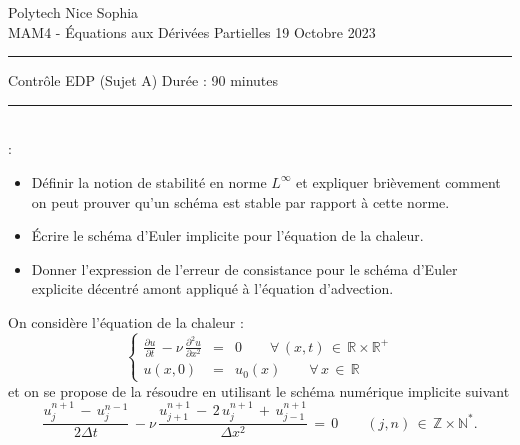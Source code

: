 \documentclass[12pt,a4paper]{article}
\begin{document}
 \hfill Polytech Nice Sophia\\
\noindent MAM4 - \'Equations aux D\'eriv\'ees Partielles \hfill 
19 Octobre 2023 \\

\hrule

\vspace{0.8cm}
\centerline {\large \sc Contrôle EDP (Sujet A) Dur\'ee : 90 minutes}
\vspace{0.8cm}


\hrule
\vspace{0.5cm}
\\

:
\begin{itemize}
\item Définir la notion de stabilité en norme $L^{\infty}$ et expliquer brièvement comment on peut prouver qu'un schéma est stable par rapport à cette norme.
\item Écrire le schéma d'Euler implicite pour l'équation de la chaleur.
\item Donner l'expression de l'erreur de consistance pour le schéma d'Euler explicite décentré amont appliqué à l'équation d'advection.
\end{itemize}

\vspace{0.5 cm}



\noindent On consid\`ere l'\'equation de la chaleur :
\begin{equation} \label{eqn:chaleur}
\left\{
\begin{array}{rcl}
\displaystyle \frac{\partial u}{\partial t} \, - \nu\, \frac{\partial^2 u}{\partial x^2}  & =  & 0  \qquad \forall \, (x,t) \, \in \, \mathbb{R} \times \mathbb{R}^+ \\
\displaystyle u(x,0)  & =  & u_0(x)  \qquad \forall \, x \, \in \, \mathbb{R}
\end{array}
\right.
\end{equation}
et on se propose de la r\'esoudre en utilisant le sch\'ema num\'erique implicite suivant
\begin{equation} \label{eqn:schema2}
\displaystyle  \frac{u_j^{n+1} \, - \, u_j^{n-1}}{2 \Delta t} \, - \nu\,  \frac{u_{j+1}^{n+1} \,- \,  2 \, u_j^{n+1} \, + \, u_{j-1}^{n+1}}{\Delta x ^2 } \,  =  \,   0 \qquad (j,n) \, \in \, \mathbb{Z} \times \mathbb{N}^* .
\end{equation}
\end{document}
